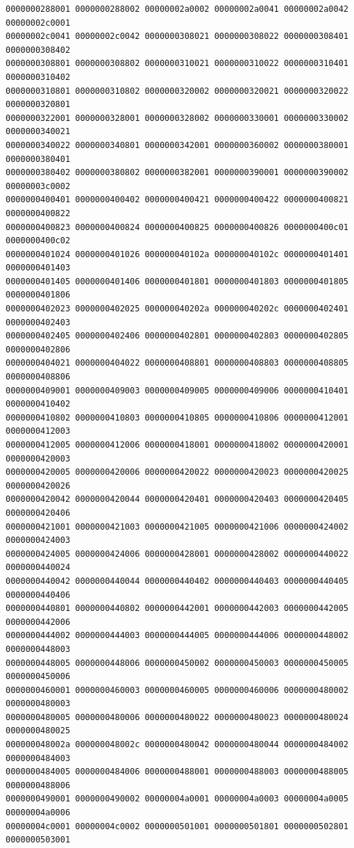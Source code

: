 \begin{Verbatim}[fontsize=\scriptsize]
0000000288001 0000000288002 00000002a0002 00000002a0041 00000002a0042 00000002c0001
00000002c0041 00000002c0042 0000000308021 0000000308022 0000000308401 0000000308402
0000000308801 0000000308802 0000000310021 0000000310022 0000000310401 0000000310402
0000000310801 0000000310802 0000000320002 0000000320021 0000000320022 0000000320801
0000000322001 0000000328001 0000000328002 0000000330001 0000000330002 0000000340021
0000000340022 0000000340801 0000000342001 0000000360002 0000000380001 0000000380401
0000000380402 0000000380802 0000000382001 0000000390001 0000000390002 00000003c0002
0000000400401 0000000400402 0000000400421 0000000400422 0000000400821 0000000400822
0000000400823 0000000400824 0000000400825 0000000400826 0000000400c01 0000000400c02
0000000401024 0000000401026 000000040102a 000000040102c 0000000401401 0000000401403
0000000401405 0000000401406 0000000401801 0000000401803 0000000401805 0000000401806
0000000402023 0000000402025 000000040202a 000000040202c 0000000402401 0000000402403
0000000402405 0000000402406 0000000402801 0000000402803 0000000402805 0000000402806
0000000404021 0000000404022 0000000408801 0000000408803 0000000408805 0000000408806
0000000409001 0000000409003 0000000409005 0000000409006 0000000410401 0000000410402
0000000410802 0000000410803 0000000410805 0000000410806 0000000412001 0000000412003
0000000412005 0000000412006 0000000418001 0000000418002 0000000420001 0000000420003
0000000420005 0000000420006 0000000420022 0000000420023 0000000420025 0000000420026
0000000420042 0000000420044 0000000420401 0000000420403 0000000420405 0000000420406
0000000421001 0000000421003 0000000421005 0000000421006 0000000424002 0000000424003
0000000424005 0000000424006 0000000428001 0000000428002 0000000440022 0000000440024
0000000440042 0000000440044 0000000440402 0000000440403 0000000440405 0000000440406
0000000440801 0000000440802 0000000442001 0000000442003 0000000442005 0000000442006
0000000444002 0000000444003 0000000444005 0000000444006 0000000448002 0000000448003
0000000448005 0000000448006 0000000450002 0000000450003 0000000450005 0000000450006
0000000460001 0000000460003 0000000460005 0000000460006 0000000480002 0000000480003
0000000480005 0000000480006 0000000480022 0000000480023 0000000480024 0000000480025
000000048002a 000000048002c 0000000480042 0000000480044 0000000484002 0000000484003
0000000484005 0000000484006 0000000488001 0000000488003 0000000488005 0000000488006
0000000490001 0000000490002 00000004a0001 00000004a0003 00000004a0005 00000004a0006
00000004c0001 00000004c0002 0000000501001 0000000501801 0000000502801 0000000503001

\end{Verbatim}
